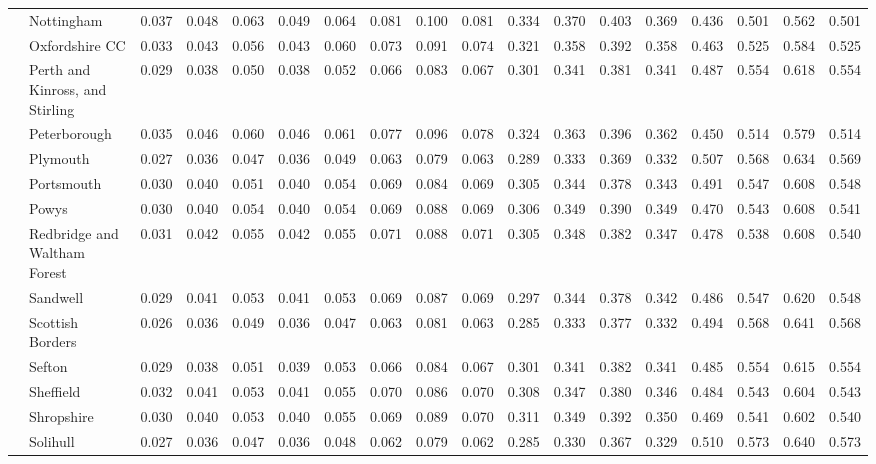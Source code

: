 \begin{tabular}{llrrrrrrrrrrrrrrrr}
 & Nottingham & 0.037 & 0.048 & 0.063 & 0.049 & 0.064 & 0.081 & 0.100 & 0.081 & 0.334 & 0.370 & 0.403 & 0.369 & 0.436 & 0.501 & 0.562 & 0.501 \\
 & Oxfordshire CC & 0.033 & 0.043 & 0.056 & 0.043 & 0.060 & 0.073 & 0.091 & 0.074 & 0.321 & 0.358 & 0.392 & 0.358 & 0.463 & 0.525 & 0.584 & 0.525 \\
 & Perth and Kinross, and Stirling & 0.029 & 0.038 & 0.050 & 0.038 & 0.052 & 0.066 & 0.083 & 0.067 & 0.301 & 0.341 & 0.381 & 0.341 & 0.487 & 0.554 & 0.618 & 0.554 \\
 & Peterborough & 0.035 & 0.046 & 0.060 & 0.046 & 0.061 & 0.077 & 0.096 & 0.078 & 0.324 & 0.363 & 0.396 & 0.362 & 0.450 & 0.514 & 0.579 & 0.514 \\
 & Plymouth & 0.027 & 0.036 & 0.047 & 0.036 & 0.049 & 0.063 & 0.079 & 0.063 & 0.289 & 0.333 & 0.369 & 0.332 & 0.507 & 0.568 & 0.634 & 0.569 \\
 & Portsmouth & 0.030 & 0.040 & 0.051 & 0.040 & 0.054 & 0.069 & 0.084 & 0.069 & 0.305 & 0.344 & 0.378 & 0.343 & 0.491 & 0.547 & 0.608 & 0.548 \\
 & Powys & 0.030 & 0.040 & 0.054 & 0.040 & 0.054 & 0.069 & 0.088 & 0.069 & 0.306 & 0.349 & 0.390 & 0.349 & 0.470 & 0.543 & 0.608 & 0.541 \\
 & Redbridge and Waltham Forest & 0.031 & 0.042 & 0.055 & 0.042 & 0.055 & 0.071 & 0.088 & 0.071 & 0.305 & 0.348 & 0.382 & 0.347 & 0.478 & 0.538 & 0.608 & 0.540 \\
 & Sandwell & 0.029 & 0.041 & 0.053 & 0.041 & 0.053 & 0.069 & 0.087 & 0.069 & 0.297 & 0.344 & 0.378 & 0.342 & 0.486 & 0.547 & 0.620 & 0.548 \\
 & Scottish Borders & 0.026 & 0.036 & 0.049 & 0.036 & 0.047 & 0.063 & 0.081 & 0.063 & 0.285 & 0.333 & 0.377 & 0.332 & 0.494 & 0.568 & 0.641 & 0.568 \\
 & Sefton & 0.029 & 0.038 & 0.051 & 0.039 & 0.053 & 0.066 & 0.084 & 0.067 & 0.301 & 0.341 & 0.382 & 0.341 & 0.485 & 0.554 & 0.615 & 0.554 \\
 & Sheffield & 0.032 & 0.041 & 0.053 & 0.041 & 0.055 & 0.070 & 0.086 & 0.070 & 0.308 & 0.347 & 0.380 & 0.346 & 0.484 & 0.543 & 0.604 & 0.543 \\
 & Shropshire & 0.030 & 0.040 & 0.053 & 0.040 & 0.055 & 0.069 & 0.089 & 0.070 & 0.311 & 0.349 & 0.392 & 0.350 & 0.469 & 0.541 & 0.602 & 0.540 \\
 & Solihull & 0.027 & 0.036 & 0.047 & 0.036 & 0.048 & 0.062 & 0.079 & 0.062 & 0.285 & 0.330 & 0.367 & 0.329 & 0.510 & 0.573 & 0.640 & 0.573 \\

\end{tabular}
